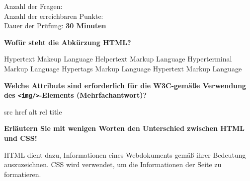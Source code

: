 \documentclass[ngerman,addpoints,10pt]{exam}
\begin{document}
		
\begin{flushleft}
		Anzahl der Fragen: \textbf{\numquestions}\\
		Anzahl der erreichbaren Punkte: \textbf{\numpoints}\\
		Dauer der Prüfung: \textbf{30 Minuten}
\end{flushleft}


		
	\begin{questions}	
	

		\question[10]
		\textbf{Wofür steht die Abkürzung HTML?}
		\droppoints
		
		\begin{checkboxes}
			\choice Hypertext Makeup Language
			\choice Helpertext Markup Language
			\choice Hyperterminal Markup Language
			\choice Hypertags Markup Language
			\CorrectChoice Hypertext Markup Language
		\end{checkboxes}
		\bigskip


		\question[10]
		\textbf{Welche Attribute sind erforderlich für die W3C-gemäße Verwendung des \texttt{<img/>}-Elements (Mehrfachantwort)?}
		\droppoints
		
		\checkboxchar{$\Box$}
		\checkedchar{$\blacksquare$}

		\begin{checkboxes}
			\CorrectChoice src
			\choice href
			\CorrectChoice alt
			\choice rel
			\choice title
		\end{checkboxes}
		\bigskip
		
						
		\question[10]
		\textbf{Erläutern Sie mit wenigen Worten den Unterschied zwischen HTML und CSS!}
		\droppoints
		\begin{solutionorbox}[4cm]
			\begin{flushleft}
			HTML dient dazu, Informationen eines Webdokuments gemäß ihrer Bedeutung auszuzeichnen.
			CSS wird verwendet, um die Informationen der Seite zu formatieren.
			\end{flushleft}
		\end{solutionorbox}
		\bigskip
		
						

\end{questions}
\end{document}
